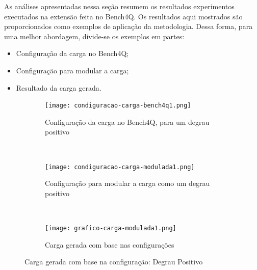 As análises apresentadas nessa seção resumem os resultados experimentos executados na extensão feita no Bench4Q. Os resultados aqui mostrados são proporcionados como exemplos de aplicação da metodologia. Dessa forma, para uma melhor abordagem, divide-se os exemplos em partes:
\begin{itemize}
	\item Configuração da carga no Bench4Q;
	\item Configuração para modular a carga;
	\item Resultado da carga gerada.
\end{itemize}

\begin{figure}[!htb]
	\begin{subfigure}{\linewidth}
		\centering
		\texttt{[image: condiguracao-carga-bench4q1.png]}
		\caption{Configuração da carga no Bench4Q, para um degrau positivo}
		\label{fig:condiguracao-carga-bench4q1}
	\end{subfigure}\\
	\begin{subfigure}{\linewidth}
		\centering
		\texttt{[image: condiguracao-carga-modulada1.png]}
		\caption{Configuração para modular a carga como um degrau positivo}
		\label{fig:condiguracao-carga-modulada1}
	\end{subfigure}\\[1ex]
	\begin{subfigure}{\linewidth}
		\centering
		\texttt{[image: grafico-carga-modulada1.png]}
		\caption{Carga gerada com base nas configurações}
		\label{fig:grafico-carga-modulada1}
	\end{subfigure}
	\caption{Carga gerada com base na configuração: Degrau Positivo}
	\label{fig:carga-modulada1}
	\fautor
\end{figure}

